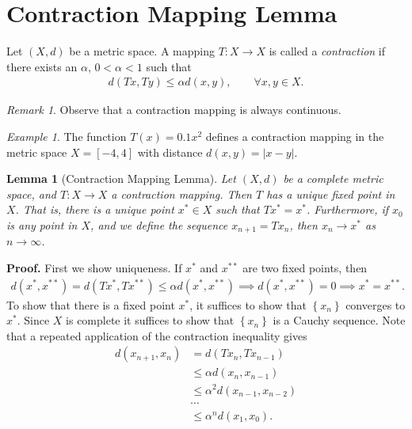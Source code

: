 \documentclass[12pt,reqno]{amsart}
\numberwithin{equation}{section}  %
\numberwithin{figure}{section}
\theoremstyle{plain}
\newtheorem{lemma}{Lemma}
\theoremstyle{definition}
\theoremstyle{remark}
\newtheorem{remark}{Remark}
\newtheorem{example}{Example}
\begin{document}
\section{Contraction Mapping Lemma}
Let $\left( X, d \right)$ be a metric space. A mapping $T: X \to X$ is called a
\emph{contraction} if there exists an $\alpha$, $0 < \alpha <1$ such that
%
%
\begin{equation*}
	\begin{split}
		d(Tx, Ty) \le \alpha d(x,y), \qquad \forall x, y \in X.
	\end{split}
\end{equation*}
%
%
\begin{remark}
	Observe that a contraction mapping is always continuous.
\end{remark}
%
%
\begin{example}
	The function $T(x) = 0.1x^2$ defines a contraction mapping in the metric space
	$X = [-4, 4]$ with distance $d(x,y) = |x-y|$. 
\end{example}
	\begin{lemma}[Contraction Mapping Lemma]
		\label{lem:fixed-point}
	Let $(X,d)$ be a complete metric space, and $T: X \to X$ a contraction
	mapping. Then $T$ has a unique fixed point in $X$. That is, there is a unique
	point $x^* \in X$ such that $Tx^* = x^*$. Furthermore, if $x_0$ is any point
	in $X$, and we define the sequence $x_{n+1} = Tx_n$, then $x_n \to x^*$ as $n
	\to \infty$.
	\end{lemma}
	{\bf Proof.} First we show uniqueness. If $x^*$ and $x^{**}$ are two fixed
	points, then
	\begin{equation*}
		\begin{split}
			d(x^*, x^{**}) = d(Tx^*, Tx^{**}) \le \alpha d(x^*, x^{**}) \implies d(x^*,
			x^{**}) = 0 \implies x^* = x^{**}.
		\end{split}
	\end{equation*}
To show that there is a fixed point $x^*$, it suffices to show that $\left\{ x_n
\right\}$ converges to $x^*$. Since $X$ is complete it suffices to show that
$\left\{ x_n \right\}$ is a Cauchy sequence. Note that a repeated application of the
contraction inequality gives
%
%
\begin{equation*}
	\begin{split}
		d\left( x_{n+1},x_n \right)
		& = d\left( Tx_n, Tx_{n-1} \right)
		\\
		& \le \alpha d\left( x_n, x_{n-1} \right)
		\\
		& \le \alpha^2 d\left( x_{n-1}, x_{n-2} \right)
		\\
		& \cdots
		\\
		& \le \alpha^n d\left( x_1, x_0 \right).
	\end{split}
\end{equation*}
\end{document}
